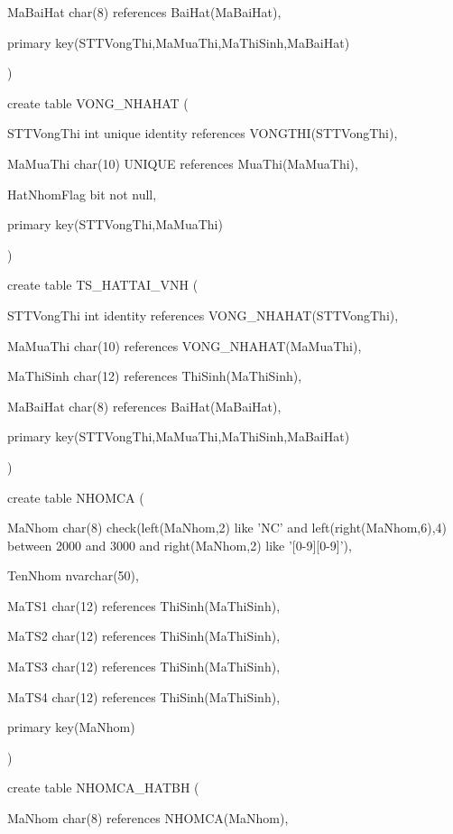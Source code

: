 \documentclass{report}
\begin{document}
	MaBaiHat char(8) references BaiHat(MaBaiHat),
	
	primary key(STTVongThi,MaMuaThi,MaThiSinh,MaBaiHat)
	
	\setlength{\parindent}{0.5cm}
)

\bigskip


create table VONG\_NHAHAT (

	\setlength{\parindent}{1.5cm}
	STTVongThi int unique identity references VONGTHI(STTVongThi),
	
	MaMuaThi char(10) UNIQUE references MuaThi(MaMuaThi),
	
	HatNhomFlag bit not null,
	
	primary key(STTVongThi,MaMuaThi)
	
	\setlength{\parindent}{0.5cm}
)

\bigskip


create table TS\_HATTAI\_VNH (

	\setlength{\parindent}{1.5cm}
	STTVongThi int identity references VONG\_NHAHAT(STTVongThi),
	
	MaMuaThi char(10) references VONG\_NHAHAT(MaMuaThi),
	
	MaThiSinh char(12) references ThiSinh(MaThiSinh),
	
	MaBaiHat char(8) references BaiHat(MaBaiHat),
	
	primary key(STTVongThi,MaMuaThi,MaThiSinh,MaBaiHat)
	
	\setlength{\parindent}{0.5cm}
)

\bigskip

create table NHOMCA (

	\setlength{\parindent}{1.5cm}
	MaNhom char(8) check(left(MaNhom,2) like 'NC' and left(right(MaNhom,6),4) between 2000 and 3000 and right(MaNhom,2) like '[0-9][0-9]'),
	
	TenNhom nvarchar(50),
	
	MaTS1 char(12) references ThiSinh(MaThiSinh),
	
	MaTS2 char(12) references ThiSinh(MaThiSinh),
	
	MaTS3 char(12) references ThiSinh(MaThiSinh),
	
	
	MaTS4 char(12) references ThiSinh(MaThiSinh),
	
	primary key(MaNhom) 
	
	\setlength{\parindent}{0.5cm}
)

\bigskip

create table NHOMCA\_HATBH (

	\setlength{\parindent}{1.5cm}
	MaNhom char(8) references NHOMCA(MaNhom),
	
\end{document}
